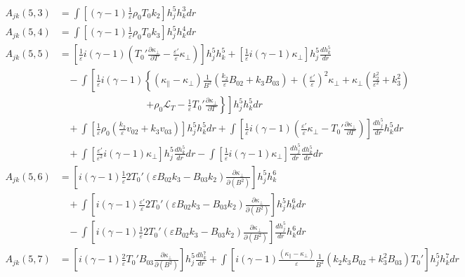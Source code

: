 \documentclass[11pt, fleqn]{article}
\newcommand{\HL}{\mathscr{L}}
\newcommand{\eps}{\varepsilon}
\begin{document}
\begin{align*}
	A_{jk}(5, 3) &=  \int \left[(\gamma - 1)\frac{1}{\eps}\rho_0T_0k_2\right] h_j^5 h_k^3 dr															\\
	A_{jk}(5, 4) &=  \int \left[(\gamma - 1)\frac{1}{\eps}\rho_0T_0k_3\right] h_j^5 h_k^4 dr															\\
	A_{jk}(5, 5) &=  \left[\frac{1}{\eps}i(\gamma - 1)\left(T_0'\frac{\partial \kappa_\bot}{\partial T} - \frac{\eps'}{\eps}\kappa_\bot\right)\right] h_j^5 h_k^5 + \left[\frac{1}{\eps}i(\gamma - 1)\kappa_\bot\right]h_j^5 \frac{dh_k^5}{dr} 			\\
				 &~~~~ -\int \left[\frac{1}{\eps}i(\gamma - 1)\left\{(\kappa_\parallel - \kappa_\bot)\frac{1}{B^2}\left(\frac{k_2}{\eps}B_{02} + k_3B_{03}\right) + \left(\frac{\eps'}{\eps}\right)^2\kappa_\bot
				 																																								   + \kappa_\bot\left(\frac{k_2^2}{\eps^2} + k_3^2\right)\right.\right. \\
				 &\qquad\qquad\qquad\qquad~~~~ 									  \left.\left.+ \rho_0\HL_T - \frac{1}{\eps}T_0'\frac{\partial \kappa_\bot}{\partial T}\right\} \right] h_j^5h_k^5 dr													\\
				 &~~~~ +\int \left[\frac{1}{\eps}\rho_0\left(\frac{k_2}{\eps}v_{02} + k_3v_{03}\right)\right] h_j^5 h_k^5 dr 
				 	   +\int\left[\frac{1}{\eps}i(\gamma - 1)\left(\frac{\eps'}{\eps}\kappa_\bot - T_0'\frac{\partial \kappa_\bot}{\partial T}\right)\right] \frac{dh_j^5}{dr} h_k^5 dr																	\\
				 &~~~~ +\int\left[\frac{\eps'}{\eps^2}i(\gamma - 1)\kappa_\bot\right] h_j^5 \frac{dh_k^5}{dr} dr - \int \left[\frac{1}{\eps}i(\gamma - 1)\kappa_\bot\right] \frac{dh_j^5}{dr}\frac{dh_k^5}{dr} dr										\\
	A_{jk}(5, 6) &=  \left[i(\gamma - 1)\frac{1}{\eps}2T_0'(\eps B_{02}k_3 - B_{03}k_2)\frac{\partial \kappa_\bot}{\partial(B^2)}\right] h_j^5 h_k^6	\\
				 &~~~~ + \int \left[i(\gamma - 1)\frac{\eps'}{\eps}2T_0'(\eps B_{02}k_3 - B_{03}k_2)\frac{\partial \kappa_\bot}{\partial(B^2)}\right] h_j^5 h_k^6 dr																					\\
				 &~~~~ - \int \left[i(\gamma - 1)\frac{1}{\eps}2T_0'(\eps B_{02}k_3 - B_{03}k_2)\frac{\partial \kappa_\bot}{\partial(B^2)}\right] \frac{dh_j^5}{dr} h_k^6 dr																			\\
	A_{jk}(5, 7) &=  \left[i(\gamma - 1)\frac{2}{\eps}T_0'B_{03}\frac{\partial \kappa_\bot}{\partial(B^2)}\right] h_j^5 \frac{dh_k^7}{dr} 
												 + \int \left[i(\gamma - 1)\frac{(\kappa_\parallel - \kappa_\bot)}{\eps} \frac{1}{B^2}(k_2k_3B_{02} + k_3^2B_{03})T_0'\right] h_j^5 h_k^7 dr 															\\

\end{align*}
\end{document}
